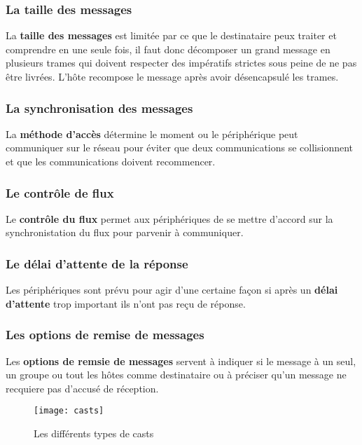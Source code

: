  \subsubsection{La taille des messages}
 La \textbf{taille des messages} est limitée par ce que le destinataire peux traiter et comprendre en une seule fois, il faut donc décomposer un grand message en plusieurs trames qui doivent respecter des impératifs strictes sous peine de ne pas être livrées. L'hôte recompose le message après avoir désencapsulé les trames.

 \subsubsection{La synchronisation des messages}
 La \textbf{méthode d'accès} détermine le moment ou le périphérique peut communiquer sur le réseau pour éviter que deux communications se collisionnent et que les communications doivent recommencer.

 \subsubsection{Le contrôle de flux}
 Le \textbf{contrôle du flux} permet aux périphériques de se mettre d'accord sur la synchronistation du flux pour parvenir à communiquer.

 \subsubsection{Le délai d'attente de la réponse}
 Les périphériques sont prévu pour agir d'une certaine façon si après un \textbf{délai d'attente} trop important ils n'ont pas reçu de réponse.

 \subsubsection{Les options de remise de messages}
 Les \textbf{options de remsie de messages} servent à indiquer si le message à un seul, un groupe ou tout les hôtes comme destinataire ou à préciser qu'un message ne recquiere pas d'accusé de réception.

 \begin{figure}[h]
	 \centering
	 \texttt{[image: casts]}
	 \caption{Les différents types de casts}
 \end{figure}




